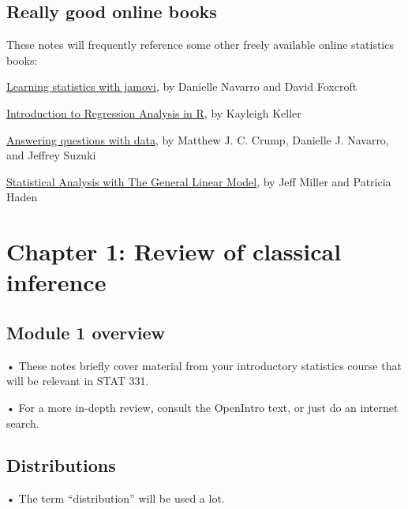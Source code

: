 \documentclass[
  letterpaper,
  DIV=11,
  numbers=noendperiod]{scrreprt}
\begin{document}
\hypertarget{really-good-online-books}{%
\section*{Really good online books}\label{really-good-online-books}}


These notes will frequently reference some other freely available online
statistics books:

\href{https://www.learnstatswithjamovi.com/}{Learning statistics with
jamovi}, by Danielle Navarro and David Foxcroft

\href{https://www.kellerbiostat.com/introregression/}{Introduction to
Regression Analysis in R}, by Kayleigh Keller

\href{https://crumplab.com/statistics/}{Answering questions with data},
by Matthew J. C. Crump, Danielle J. Navarro, and Jeffrey Suzuki

\href{https://drive.google.com/file/d/0B1fyuTuvj3YoaFdUR3FZaXNuNXc/view?resourcekey=0-plOmKmQ0TIyMjlfBY3OiyQ}{Statistical
Analysis with The General Linear Model}, by Jeff Miller and Patricia
Haden


\hypertarget{chapter-1-review-of-classical-inference}{%
\chapter{Chapter 1: Review of classical
inference}\label{chapter-1-review-of-classical-inference}}

\hypertarget{module-1-overview}{%
\section{Module 1 overview}\label{module-1-overview}}

• These notes briefly cover material from your introductory statistics
course that will be relevant in STAT 331.

• For a more in-depth review, consult the OpenIntro text, or just do an
internet search.

\hypertarget{distributions}{%
\section{Distributions}\label{distributions}}

• The term ``distribution'' will be used a lot.
\end{document}

